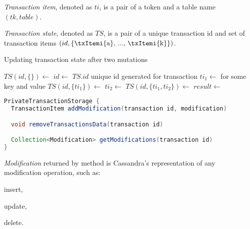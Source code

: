 \begin{definition}
  \label{def:transactionItem}
  \emph{Transaction item}, denoted as $ti$, is a pair of a token and a table name $(tk,table)$.
\end{definition}

\begin{definition}
  \label{def:transactionState}
  \emph{Transaction state}, denoted as $TS$, is a pair of a unique transaction id and set of transaction items $(id, \{ \text{\txItemi{a}, ..., \txItemi{k}} \})$.
\end{definition}



\begin{algorithm}
  \caption{Updating transaction state after two mutations}
  \label{alg:updateTxState}
  \begin{algorithmic}  	    
    \State $TS(id, \{ \}) \gets$ 
    \State $id \gets$ $TS.id$ unique id generated for transaction
    \State $ti_{1} \gets $  \Comment for some key and value
    \State $TS(id, \{ ti_{1} \}) \gets$ 
    \State $ti_{2} \gets $ 
    \State $TS(id, \{ ti_{1}, ti_{2} \}) \gets$  
    \State $result \gets $     
  \end{algorithmic}
\end{algorithm}


\begin{lstlisting}[language=Java,style=outcode,label={lst:privateTransactionStorage},caption={API of private transaction storage}]
PrivateTransactionStorage {
  TransactionItem addModification(transaction id, modification)

  void removeTransactionsData(transaction id)

  Collection<Modification> getModifications(transaction id)        
}

\end{lstlisting}

\emph{Modification} returned by  method is Cassandra's representation of any modification operation, such as: \begin{enumerate*}[label=\alph*)] \item insert, \item update, \item delete. \end{enumerate*}

